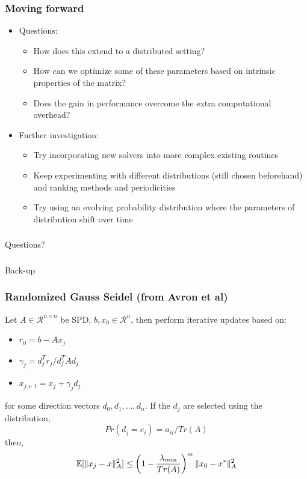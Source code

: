 \documentclass{beamer}
\DeclarePairedDelimiter{\norm}{\lVert}{\rVert}
\begin{document}
\begin{frame}
	\frametitle{Moving forward}
	    \begin{itemize}
	        \item Questions:
	            \begin{itemize}
	                \item How does this extend to a distributed setting?
	                \item How can we optimize some of these parameters based on intrinsic properties of the matrix?
	                \item Does the gain in performance overcome the extra computational overhead?
	            \end{itemize}
	        \item Further investigation:
	            \begin{itemize}
            		\item Try incorporating new solvers into more complex existing routines
            		\item Keep experimenting with different distributions (still chosen beforehand) and ranking methods and periodicities
            		\item Try using an evolving probability distribution where the parameters of distribution shift over time 
	            \end{itemize}
	     \end{itemize}       
\end{frame}
 
\begin{frame}
	\frametitle{}
	\begin{center}
	    Questions? 
	\end{center}
\end{frame}

\begin{frame}
	\frametitle{}
	\begin{center}
	    Back-up
	\end{center}
\end{frame}

\begin{frame}
	\frametitle{Randomized Gauss Seidel (from Avron et al)}
    Let $A \in \mathcal{R}^{n\times n}$ be SPD, $b, x_0 \in \mathcal{R}^n$, then perform iterative updates based on:
        \begin{itemize}
            \item $r_0 = b - Ax_j$
            \item $\gamma_j = d^T_jr_j / d_j^TAd_j$
            \item $x_{j+1} = x_j + \gamma_j d_j$
        \end{itemize}
    for some direction vectors $d_0, d_1, \ldots, d_n$. If the $d_j$ are selected using the distribution,
        \begin{equation}
            Pr(d_j = e_i) = a_{ii} / Tr(A)
        \end{equation}
    then,
        \begin{equation}
            \mathbb{E}[\norm{x_j - x }_A^2] \leq \left( 1 - \frac{\lambda_{min}}{Tr(A)}\right)^m \norm{x_0 - x^*}_A^2
        \end{equation}
\end{frame}
\end{document}
